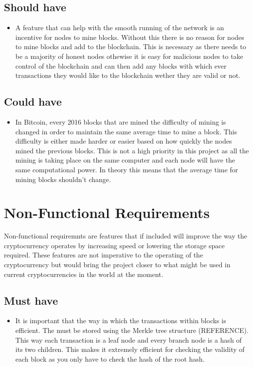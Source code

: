 \documentclass{l4proj}
\begin{document}
\subsection{Should have}
\begin{itemize}
    \item A feature that can help with the smooth running of the network is an incentive for nodes to mine blocks. Without this there
    is no reason for nodes to mine blocks and add to the blockchain. This is necessary as there needs to be a majority of 
    honest nodes othewise it is easy for malicious nodes to take control of the blockchain and can then add any blocks with
    which ever transactions they would like to the blockchain wether they are valid or not.
\end{itemize}


\subsection{Could have}
\begin{itemize}
    \item In Bitcoin, every 2016 blocks that are mined the difficulty of mining is changed in order to maintain the same average time
    to mine a block. This difficulty is either made harder or easier based on how quickly the nodes mined the previous blocks.
    This is not a high priority in this project as all the mining is taking place on the same computer and each node will have
    the same computational power. In theory this means that the average time for mining blocks shouldn't change.
\end{itemize}


\section{Non-Functional Requirements}
Non-functional requiremnts are features that if included will improve the way the cryptocurrency operates by increasing
speed or lowering the storage space required. These features are not imperative to the operating of the cryptocurrency
but would bring the project closer to what might be used in current cryptocurrencies in the world at the moment.

\subsection{Must have}
\begin{itemize}
    \item It is important that the way in which the transactions within blocks is efficient. The must be stored using the Merkle
    tree structure (REFERENCE). This way each transaction is a leaf node and every branch node is a hash of its two children.
    This makes it extremely efficient for checking the validity of each block as you only have to check the hash of the root
    hash.
\end{itemize}
\end{document}
